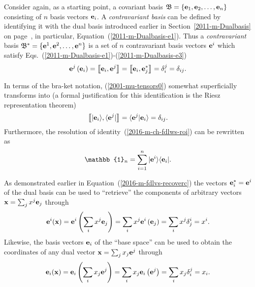 Consider again, as a starting point, a covariant basis
${\mathfrak B}=\{{\bf e}_1,{\bf e}_2,\ldots ,{\bf e}_n\}$ consisting of
$n$ basis vectors ${\bf e}_i$.
A {\em contravariant basis} can be defined by identifying it with the dual basis
introduced earlier in Section~\ref{2011-m-Dualbasis} on page~\pageref{2011-m-Dualbasis},
in particular, Equation~(\ref{2011-m-Dualbasis-e1}).
Thus a {\em contravariant} basis
${\mathfrak B^\ast}=\{{\bf e}^1,{\bf e}^2,\ldots ,{\bf e}^n\}$ is a set of $n$ contravariant
basis vectors ${\bf e}^i$
which satisfy Eqs.~(\ref{2011-m-Dualbasis-e1})-(\ref{2011-m-Dualbasis-e3})
\begin{equation}
{\bf e}^j \left( {\bf e}_i \right) = \left\llbracket {\bf e}_i,{\bf e}^j \right\rrbracket  =  \left\llbracket {\bf e}_i,  {\bf e}_j^\ast \right\rrbracket
= \delta^j_i = \delta_{ij}
.
\label{2001-mu-tensors0}
\end{equation}

In terms of the bra-ket notation, (\ref{2001-mu-tensors0}) somewhat superficially transforms into
(a formal justification for this identification is the Riesz representation theorem)
\begin{equation}
\left\llbracket  \vert {\bf e}_i \rangle , \langle  {\bf e}^j \vert \right\rrbracket =
\langle  {\bf e}^j \vert {\bf e}_i \rangle =
  \delta_{ij}
.
\label{2001-mu-tensors0bk}
\end{equation}
Furthermore, the resolution of identity~(\ref{2016-m-ch-fdlws-roi}) can be rewritten as
\begin{equation}
 \mathbb{1}_n = \sum_{i=1}^n \vert {\bf e}^i \rangle \langle {\bf e}_i \vert
.
\label{2016-m-ch-tensor-roi}
\end{equation}

As demonstrated earlier in Equation~(\ref{2016-m-fdlvs-recoverc}) the vectors ${\bf e}^\ast_i = {\bf e}^i$ of the dual basis can be used to ``retrieve'' the components of arbitrary vectors
${\bf x} = \sum_j x^j {\bf e}_j$  through
\begin{equation}
{\bf e}^i ( {\bf x} ) =
{\bf e}^i \left( \sum_i x^j {\bf e}_j \right) =
\sum_i  x^j {\bf e}^i \left({\bf e}_j \right) =
\sum_i  x^j \delta^i_j =
 x^i.
\label{2016-m-tensor-recoverc}
\end{equation}
Likewise, the basis vectors ${\bf e}_i$ of the ``base space'' can be used to obtain the coordinates of any dual vector ${\bf x} = \sum_j x_j {\bf e}^j$  through
\begin{equation}
{\bf e}_i ( {\bf x} ) =
{\bf e}_i \left( \sum_i x_j {\bf e}^j \right) =
\sum_i  x_j {\bf e}_i \left({\bf e}^j \right) =
\sum_i  x_j \delta_i^j =
 x_i.
\label{2016-m-tensor-recoverc2}
\end{equation}


